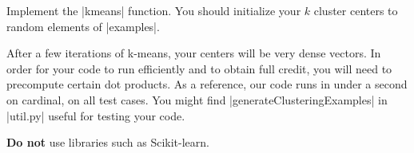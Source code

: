 \item {}

Implement the |kmeans| function. You should initialize your $k$
cluster centers to random elements of |examples|.


After a few iterations of k-means, your centers will be very dense
vectors. In order for your code to run efficiently and to obtain full
credit, you will need to precompute certain dot products. As a reference,
our code runs in under a second on cardinal, on all test cases. You might
find |generateClusteringExamples|
in |util.py| useful for testing your code.

\textbf{Do not} use libraries such as Scikit-learn.